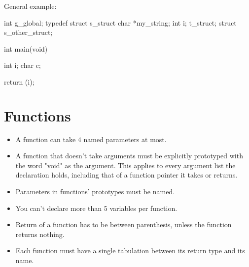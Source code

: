 \documentclass{42-en}
\begin{document}
\vspace{1cm}

            General example:
            \begin{42ccode}
int             g_global;
typedef struct s_struct
{
    char    *my_string;
    int     i;
}               t_struct;
struct s_other_struct;

int     main(void)
{
    int     i;
    char    c;

    return (i);
}
            \end{42ccode}
            \newpage

    \section{Functions}

        \begin{itemize}

            \item A function can take 4 named parameters at most.

            \item A function that doesn't take arguments must be
                explicitly prototyped with the word "void" as the
                argument. This applies to every argument list the declaration
                holds, including that of a function pointer it takes or
                returns.

            \item Parameters in functions' prototypes must be named.

            \item You can't declare more than 5 variables per function.

            \item Return of a function has to be between parenthesis, unless the
              function returns nothing.

            \item Each function must have a single tabulation between its
                return type and its name.

        \end{itemize}

\vspace{1cm}
        
\end{document}

